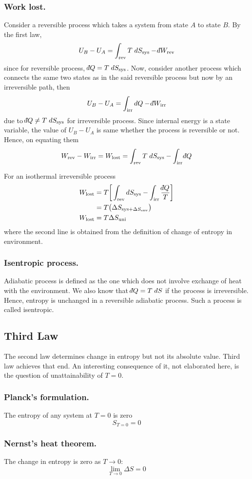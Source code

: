 \documentclass[../../../Main.tex]{subfiles}
\begin{document}
\subsubsection*{Work lost.} Consider a reversible process which takes a system from state $A$ to state $B$. By the first law, 
\begin{equation*}
    U_B-U_A=\int_{\text{rev}}T\;dS_{\text{sys}}-\dbar W_{\text{rev}}
\end{equation*}
since for reversible process, $\dbar Q=T\;dS_{\text{sys}}$. Now, consider another process which connects the same two states as in the said reversible process but now by an irreversible path, then
\begin{equation*}
    U_B-U_A=\int_{\text{irr}}dQ-\dbar W_{\text{irr}}
\end{equation*}
due to $\dbar Q\neq T\;dS_{\text{sys}}$ for irreversible process. Since internal energy is a state variable, the value of $U_B - U_A$ is same whether the process is reversible or not. Hence, on equating them 
\begin{equation*}
    W_{\text{rev}}-W_{\text{irr}}=W_{\text{lost}}= \int_{\text{rev}}T\;dS_{\text{sys}}-\int_{\text{irr}}\dbar Q
\end{equation*}

For an isothermal irreversible process
\begin{align*}
    W_{\text{lost}}&=T\bigg[ \int_{\text{rev}}dS_{\text{sys}}-\int_{\text{irr}}\frac{\dbar Q}{T} \bigg]\\
    &=T\big(\Delta S_{\text{sys}+\Delta S_{\text{env}}}\big)\\
    W_{\text{lost}}&=T\Delta S_\text{uni}
\end{align*}
where the second line is obtained from the definition of change of entropy in environment.

\subsubsection*{Isentropic process.} Adiabatic process is defined as the one which does not involve exchange of heat with the environment. We also know that $\dbar Q= T\; d S$ if the process is irreversible. Hence, entropy is unchanged in a reversible adiabatic process. Such a process is called isentropic. 

\subsection*{Third Law}
The second law determines change in entropy but not its absolute value. Third law achieves that end. An interesting consequence of it, not elaborated here, is the question of unattainability of $T = 0$.

\subsubsection*{Planck’s formulation.} The entropy of any system at $T = 0$ is zero
\begin{equation*}
    S_{T=0}=0
\end{equation*}

\subsubsection*{Nernst’s heat theorem.} The change in entropy is zero as $T \rightarrow 0$:
\begin{equation*}
    \lim_{T\rightarrow0}\Delta S=0
\end{equation*}
\end{document}
